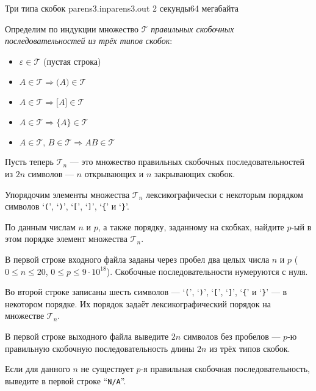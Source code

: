 \begin{problem}{Три типа скобок}
{parens3.in}{parens3.out}
{2 секунды}{64 мегабайта}

\newcommand {\T} {\mathcal{T}}
Определим по индукции множество $\T$ {\it правильных скобочных
последовательностей из трёх типов скобок}:
\renewcommand {\t} {\texttt}

\begin {itemize}
 \item $\varepsilon \in \T$ (пустая строка)
 \item $A \in \T \Rightarrow \t{(}A\t{)} \in \T$
 \item $A \in \T \Rightarrow \t{[}A\t{]} \in \T$
 \item $A \in \T \Rightarrow \t{\{}A\t{\}} \in \T$
 \item $A \in \T, \, B \in \T \Rightarrow AB \in \T$
\end {itemize}

Пусть теперь $\T_n$ --- это множество правильных скобочных
последовательностей из $2 n$ символов --- $n$ открывающих и
$n$ закрывающих скобок.

Упорядочим элементы множества $\T_n$ лексикографически с некоторым
порядком символов `\t{(}', `\t{)}', `\t{[}', `\t{]}', `\t{\{}' и `\t{\}}'.

По данным числам $n$ и $p$, а также порядку, заданному на скобках,
найдите $p$-ый в этом порядке элемент множества $\T_n$.

\InputFile

В первой строке входного файла заданы через пробел два целых числа $n$ и $p$
($0 \leqslant n \leqslant 20$, $0 \leqslant p \leqslant 9 \cdot 10^{18}$).
Скобочные последовательности нумеруются с нуля.

Во второй строке записаны шесть символов ---
`\t{(}', `\t{)}', `\t{[}', `\t{]}', `\t{\{}' и `\t{\}}' --- в некотором
порядке. Их порядок задаёт лексикографический порядок на множестве $\T_n$.

\OutputFile

В первой строке выходного файла выведите $2 n$ символов без пробелов ---
$p$-ю правильную скобочную последовательность длины $2 n$ из трёх
типов скобок.

Если для данного $n$ не существует $p$-я правильная скобочная
последовательность, выведите в первой строке ``\t{N/A}''.

\Examples

\begin{example}
%
%
%
%
\end{example}

\end{problem}
